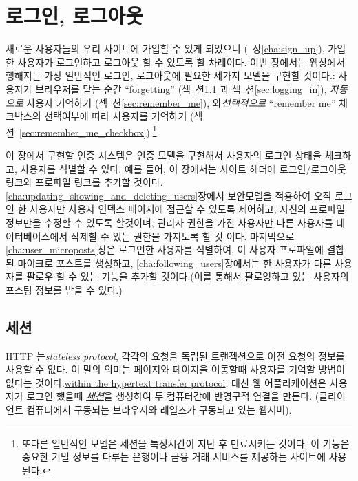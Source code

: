 \chapter{로그인, 로그아웃} \label{cha:log_in_log_out} 

 

새로운 사용자들의 우리 사이트에 가입할 수 있게 되었으니 (~장\ref{cha:sign_up}), 가입한 사용자가 로그인하고 로그아웃 할 수 있도록 할 차례이다. 이번 장에서는 웹상에서 행해지는 가장 일반적인 로그인, 로그아웃에 필요한 세가지 모델을 구현할 것이다.:  사용자가 브라우저를 닫는 순간 ``forgetting'' (섹~션\ref{sec:sessions_and_failed_login}  과 섹~션\ref{sec:logging_in}), \emph{자동으로} 사용자 기억하기 (섹~션\ref{sec:remember_me}),  와\emph{선택적으로} ``remember me'' 체크박스의 선택여부에 따라 사용자를 기억하기 (섹션~\ref{sec:remember_me_checkbox}).\footnote{또다른 일반적인 모델은 세션을 특정시간이 지난 후 만료시키는 것이다. 이 기능은 중요한 기밀 정보를 다루는 은행이나 금융 거래 서비스를 제공하는 사이트에 사용된다.} 

이 장에서 구현할 인증 시스템은 인증 모델을 구현해서 사용자의 로그인 상태을 체크하고, 사용자를 식별할 수 있다. 예를 들어, 이 장에서는 사이트 헤더에 로그인/로그아웃 링크와 프로파일 링크를 추가할 것이다. \ref{cha:updating_showing_and_deleting_users}장에서 보안모델을 적용하여 오직 로그인 한 사용자만 사용자 인덱스 페이지에 접근할 수 있도록 제어하고, 자신의 프로파일 정보만을 수정할 수 있도록 할것이며, 관리자 권한을 가진 사용자만 다른 사용자를 데이터베이스에서 삭제할 수 있는 권한을 가지도록 할 것 이다. 마지막으로 \ref{cha:user_microposts}장은 로그인한 사용자를 식별하여, 이 사용자 프로파일에 결합된 마이크로 포스트를 생성하고, \ref{cha:following_users}장에서는 한 사용자가 다른 사용자를 팔로우 할 수 있는 기능을 추가할 것이다.(이를 통해서 팔로잉하고 있는 사용자의 포스팅 정보를 받을 수 있다.) 

\section{세션} \label{sec:sessions_and_failed_login} 

\href{http://en.wikipedia.org/wiki/Hypertext_Transfer_Protocol}{HTTP} 는\href{https://en.wikipedia.org/wiki/Stateless_protocol}{\emph{stateless protocol}}, 각각의 요청을 독립된 트랜젝션으로 이전 요청의 정보를 사용할 수 없다. 이 말의 의미는 페이지와 페이지을 이동할때 사용자를 기억할 방법이 없다는 것이다.\href{http://en.wikipedia.org/wiki/Hypertext_Transfer_Protocol#HTTP_session_state}{within the hypertext transfer protocol}; 대신 웹 어플리케이션은 사용자가 로그인 했을때 \href{http://en.wikipedia.org/wiki/Session_(computer_science)}{\emph{세션}}을 생성하여 두 컴퓨터간에 반영구적 연결을 만든다. (클라이언트 컴퓨터에서 구동되는 브라우저와 레일즈가 구동되고 있는 웹서버). 

